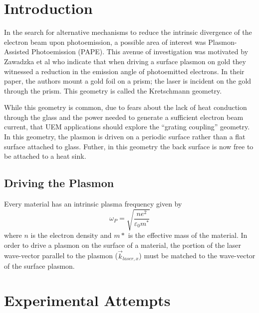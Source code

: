 
\section{Introduction}

In the search for alternative mechanisms to reduce the intrinsic divergence of the electron beam upon photoemission, a possible area of interest was Plasmon-Assisted Photoemission (PAPE). 
This avenue of investigation was motivated by Zawadzka et al \cite{zawadzka_evanescent_2001} who indicate that when driving a surface plasmon on gold they witnessed a reduction in the emission angle of photoemitted electrons.
In their paper, the authors mount a gold foil on a prism; the laser is incident on the gold through the prism.
This geometry is called the Kretschmann geometry.

While this geometry is common, due to fears about the lack of heat conduction through the glass and the power needed to generate a sufficient electron beam current, that UEM applications should explore the ``grating coupling'' geometry.
In this geometry, the plasmon is driven on a periodic surface rather than a flat surface attached to glass.
Futher, in this geometry the back surface is now free to be attached to a heat sink.

\subsection{Driving the Plasmon}

Every material has an intrinsic plasma frequency given by 
\begin{equation}
  \omega_{P} = \sqrt{\frac{n e^2}{\varepsilon_{0} m^*}}
\end{equation}
where $n$ is the electron density and $m*$ is the effective mass of the material.
In order to drive a plasmon on the surface of a material, the portion of the laser wave-vector parallel to the plasmon ($\vec{k}_{laser,x}$) must be matched to the wave-vector of the surface plasmon.

\section{Experimental Attempts}

